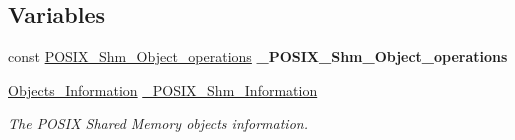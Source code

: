 \subsection*{Variables}
\begin{DoxyCompactItemize}
\item 
\mbox{\label{group__POSIXShmPrivate_ga49c9c9173b34ab7944304b1d280ee6e7}} 
const \mbox{\hyperlink{structPOSIX__Shm__Object__operations}{P\+O\+S\+I\+X\+\_\+\+Shm\+\_\+\+Object\+\_\+operations}} {\bfseries \+\_\+\+P\+O\+S\+I\+X\+\_\+\+Shm\+\_\+\+Object\+\_\+operations}
\item 
\mbox{\label{group__POSIXShmPrivate_gaa51854bc9f8ede4d5e4f4a3347dcf18e}} 
\mbox{\hyperlink{structObjects__Information}{Objects\+\_\+\+Information}} \mbox{\hyperlink{group__POSIXShmPrivate_gaa51854bc9f8ede4d5e4f4a3347dcf18e}{\+\_\+\+P\+O\+S\+I\+X\+\_\+\+Shm\+\_\+\+Information}}
\begin{DoxyCompactList}\small\item\em The P\+O\+S\+IX Shared Memory objects information. \end{DoxyCompactList}\end{DoxyCompactItemize}
